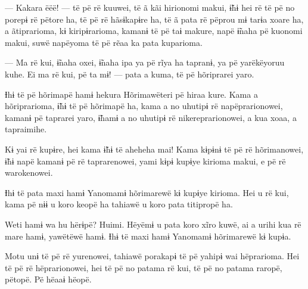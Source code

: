 --- Kakara ëëë! --- të pë rë kuuwei, të ã kãi hirionomi makui, ɨ̃hɨ hei rë
të pë no porepɨ rë pëtore ha, të pë rë hãsɨkapɨre ha, të ã pata rë
pëprou mɨ tarɨa xoare ha, a ãtiprarioma, kɨ kiripɨrarioma, kamanɨ të pë
taɨ makure, napë ɨ̃naha pë kuonomi makui, suwë napëyoma të pë rẽaa ka
pata kuparioma. 


--- Ma rë kui, ɨ̃naha oxei, ɨ̃naha ipa ya pë rĩya ha tapranɨ, ya pë
yarëkëyoruu kuhe. Ei ma rë kui, pë ta mɨ! --- pata a kuma, të pë
hõriprarei yaro. 

Ɨhɨ të pë hõrimapë hamɨ hekura Hõrimawëteri pë hiraa kure. Kama a
hõriprarioma, ɨ̃hɨ të pë hõrimapë ha, kama a no uhutipɨ rë
napëprarionowei, kamanɨ pë taprarei yaro, ɨ̃hamɨ a no uhutipɨ rë
nikereprarionowei, a kua xoaa, a tapraimihe. 


Kɨ yai rë kupɨre, hei kama ɨ̃hɨ të aheheha mai! Kama kɨpɨnɨ të pë rë
hõrimanowei, ɨ̃hɨ napë kamanɨ pë rë taprarenowei, yami kɨpɨ kupɨye
kirioma makui, e pë rë warokenowei. 



Ɨhɨ të pata maxi hamɨ Yanomamɨ hõrimarewë kɨ kupɨye kirioma. Hei u rë
kui, kama pë nɨɨ u koro keopë ha tahiawë u koro pata titipropë ha. 

Weti hamɨ wa hu hërɨpë? Huimi. Hëyëmɨ u pata koro xĩro kuwë, ai a urihi
kua rë mare hamɨ, yawëtëwë hamɨ. Ɨhɨ të maxi hamɨ Yanomamɨ hõrimarewë kɨ
kupɨa. 


Motu unɨ të pë rë yurenowei, tahiawë porakapɨ të pë yahipɨ wai
hëprarioma. Hei të pë rë hëprarionowei, hei të pë no patama rë kui, të
pë no patama raropë, pëtopë. Pë hëaaɨ hëopë. 

